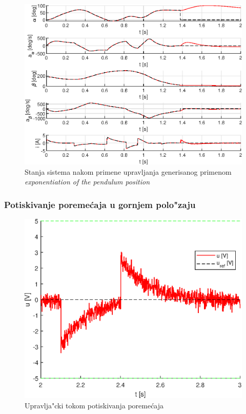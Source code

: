 \documentclass[a4paper,11pt]{article}
\theoremstyle{definition} \newtheorem{deff}{Definicija}[section]
\theoremstyle{definition} \newtheorem{prim}[deff]{Primer}
\theoremstyle{plain} \newtheorem{teor}[deff]{Teorema}
\begin{document}
	\begin{figure}[!h]
		\centering
		\includegraphics[width=.9\linewidth]{slike/States_ExpControl_trajectory.eps}
		\caption{Stanja sistema nakom primene upravljanja generisanog primenom \emph{exponentiation of the pendulum position}}
		\label{fig:traj_energyexp}
	\end{figure}
	\clearpage
	
	
	\subsubsection{Potiskivanje poreme\'caja u gornjem polo"zaju} \label{sec:por}
	
	\begin{figure}[!h]
		\centering
		\includegraphics[width=0.52\linewidth]{slike/Control_dist.eps}
		\caption{Upravlja"cki tokom potiskivanja poreme\'caja}
		\label{fig:cnrl_dist}
	\end{figure}
	
\end{document}
